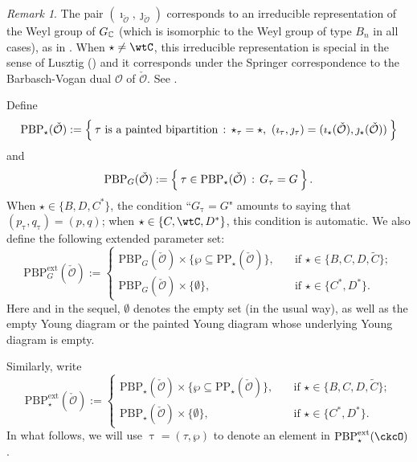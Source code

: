 \documentclass[11pt,a4paper]{amsart}
\newcommand{\CO}{{\mathcal {O}}}
\numberwithin{equation}{section}
\theoremstyle{remark}
\newtheorem*{remark}{Remark}
\def\PBPes{\mathrm{PBP}^{\mathrm{ext}}_{\star}}
\begin{document}
\begin{remark} The pair $(\imath_{\check \CO}, \jmath_{\check \CO})$ corresponds to an irreducible representation of the  Weyl group of $G_{\mathbb{C}}$ (which is isomorphic to the Weyl group of type $B_n$ in all cases), as in \cite[Section 11.4]{Carter}.  When $\star\neq \wtC$, this irreducible representation is special in the sense of Lusztig (\cite{Lsp}) and it corresponds under the Springer correspondence to the Barbasch-Vogan dual $\CO$ of $\check \CO$. See \cite[Section 8]{BMSZa}.

\end{remark}


Define
\[
\mathrm{PBP}_\star(\check \CO):=\Set{
\tau\textrm{ is a painted bipartition}  \,:\,  \star_\tau = \star, \ (\imath_\tau,\jmath_\tau) = (\imath_\star(\check \CO), \jmath_\star(\check \CO))
}
\]
and
\[
\mathrm{PBP}_G(\check \CO)\\
:=\Set{
\tau\in \mathrm{PBP}_\star(\check \CO)  \,:\,  G_\tau=G
}.
\]
When $\star\in \{B, D, C^*\}$,  the condition ``$G_{\uptau} = G$" amounts to saying that $(p_\uptau, q_\uptau)=(p,q)$; when  $\star\in \{C, \wtC, D^*\}$, this condition is automatic. 
We also define the following extended parameter set:
\begin{equation}\label{def:PBPes}
\mathrm{PBP}^{\mathrm{ext}}_G(\check \CO):=\begin{cases}
\mathrm{PBP}_G(\check \CO)\times \{\wp\subseteq \mathrm{PP}_\star(\check \CO)\},\quad& \textrm{if }\star\in \{B,C, D, \widetilde C\};\\
\mathrm{PBP}_G(\check \CO)\times \{\emptyset \},\quad& \textrm{if }\star\in \{C^*, D^*\}.
\end{cases}
\end{equation}
Here and in the sequel, $\emptyset$ denotes the empty set (in the usual way), as well as the empty Young diagram or the painted Young diagram whose underlying Young diagram is empty.

Similarly, write  %
\[
\mathrm{PBP}^{\mathrm{ext}}_\star(\check \CO):=\begin{cases}
\mathrm{PBP}_\star(\check \CO)\times \{\wp\subseteq \mathrm{PP}_\star(\check \CO)\},\quad& \textrm{if }\star\in \{B,C, D, \widetilde C\};\\
\mathrm{PBP}_\star(\check \CO)\times \{\emptyset \},\quad& \textrm{if }\star\in \{C^*, D^*\}.
\end{cases}
\]
In what follows, we will use $\uptau=(\tau,\wp)$ to denote an element in $\PBPes(\ckcO)$.
\end{document}
